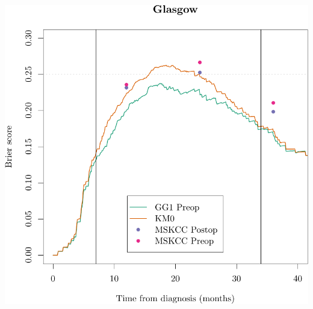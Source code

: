 \documentclass{article}\usepackage[]{graphicx}\usepackage[]{color}
\makeatletter
\def\maxwidth{ %
  \ifdim\Gin@nat@width>\linewidth
    \linewidth
  \else
    \Gin@nat@width
  \fi
}
\newenvironment{knitrout}{}{} %
\makeatother
\begin{document}
\begin{knitrout}
{\centering \includegraphics[width=\maxwidth]{figure/07-prob-bs-paths-plot-glasgow-2} 

}



\end{knitrout}
\end{document}
